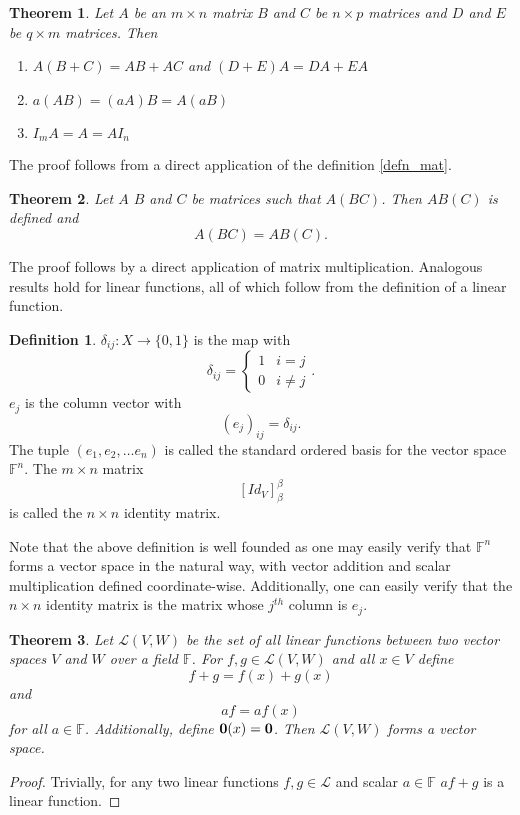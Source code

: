 \documentclass[oneside, 12pt]{book}
\newtheorem{thm}{Theorem}[section]
\theoremstyle{definition}
\newtheorem{defn}{Definition}[section]
\begin{document}
\begin{thm}
  \label{thm_matt}
  Let $A$ be an $m \times n$ matrix $B$ and $C$ be $n \times p$ matrices and $D$ and $E$ be $q \times m$ matrices. Then
  \begin{enumerate}
    \item $A(B+C)=AB+AC$ and $(D+E)A=DA+EA$
    \item $a(AB)=(aA)B=A(aB)$
    \item$I_{m}A=A=AI_{n}$
  \end{enumerate}
\end{thm}
The proof follows from a direct application of the definition \ref{defn_mat}.
\begin{thm}
  \label{mat_assc}
  Let $A$ $B$ and $C$ be matrices such that $A(BC)$. Then $AB(C)$ is defined and \[A(BC)=AB(C).\]
\end{thm}
The proof follows by a direct application of matrix multiplication. Analogous results hold for linear functions, all of which follow from the definition of a linear function.
\begin{defn}
  \label{defn_id}
  $\delta_{ij}:X \to \{0,1\}$ is the map with \[\delta_{ij}=
  \begin{cases}
    1 & i=j \\
    0 & i\neq j
  \end{cases}.\]
$e_{j}$ is the column vector with \[(e_{j})_{ij}=\delta_{ij}.\]
The tuple $(e_{1}, e_{2}, \dots e_{n})$ is called the standard ordered basis for the vector space $\mathbb{F}^{n}$. The $m \times n$ matrix \[[Id_{V}]_{\beta}^{\beta}\] is called the $n \times n$ identity matrix.

\end{defn}
Note that the above definition is well founded as one may easily verify that $\mathbb{F}^{n}$ forms a vector space in the natural way, with vector addition and scalar multiplication defined coordinate-wise.
Additionally, one can easily verify that the $n \times n$ identity matrix is the matrix whose $j^{th}$ column is $e_{j}$.
\begin{thm}
  \label{thm_spacelin}
  Let $\mathcal{L}(V,W)$ be the set of all linear functions between two vector spaces $V$ and $W$ over a field $\mathbb{F}$. For $f,g \in \mathcal{L}(V,W)$ and all $x \in V$ define \[f+g=f(x)+g(x)\] and \[af=af(x)\] for all $a \in \mathbb{F}$. Additionally, define $\bold{0}(x)=\bold{0}$. Then $\mathcal{L}(V,W)$ forms a vector space.
\end{thm}
\begin{proof}
Trivially, for any two linear functions $f,g \in \mathcal{L}$ and scalar $a \in \mathbb{F}$ $af+g$ is a linear function.
\end{proof}
\end{document}
